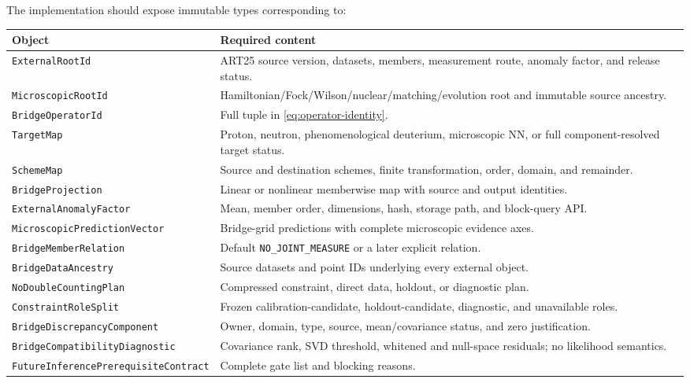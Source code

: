 \documentclass[11pt]{article}
\begin{document}
The implementation should expose immutable types corresponding to:
\begin{longtable}{L{0.34\textwidth}L{0.57\textwidth}}
\toprule
Object & Required content\\
\midrule
\endhead
\texttt{ExternalRootId} & ART25 source version, datasets, members, measurement route, anomaly factor, and release status.\\
\texttt{MicroscopicRootId} & Hamiltonian/Fock/Wilson/nuclear/matching/evolution root and immutable source ancestry.\\
\texttt{BridgeOperatorId} & Full tuple in \cref{eq:operator-identity}.\\
\texttt{TargetMap} & Proton, neutron, phenomenological deuterium, microscopic NN, or full component-resolved target status.\\
\texttt{SchemeMap} & Source and destination schemes, finite transformation, order, domain, and remainder.\\
\texttt{BridgeProjection} & Linear or nonlinear memberwise map with source and output identities.\\
\texttt{ExternalAnomalyFactor} & Mean, member order, dimensions, hash, storage path, and block-query API.\\
\texttt{MicroscopicPredictionVector} & Bridge-grid predictions with complete microscopic evidence axes.\\
\texttt{BridgeMemberRelation} & Default \texttt{NO\_JOINT\_MEASURE} or a later explicit relation.\\
\texttt{BridgeDataAncestry} & Source datasets and point IDs underlying every external object.\\
\texttt{NoDoubleCountingPlan} & Compressed constraint, direct data, holdout, or diagnostic plan.\\
\texttt{ConstraintRoleSplit} & Frozen calibration-candidate, holdout-candidate, diagnostic, and unavailable roles.\\
\texttt{BridgeDiscrepancyComponent} & Owner, domain, type, source, mean/covariance status, and zero justification.\\
\texttt{BridgeCompatibilityDiagnostic} & Covariance rank, SVD threshold, whitened and null-space residuals; no likelihood semantics.\\
\texttt{FutureInference}\newline\texttt{PrerequisiteContract} & Complete gate list and blocking reasons.\\
\bottomrule
\end{longtable}
\end{document}
